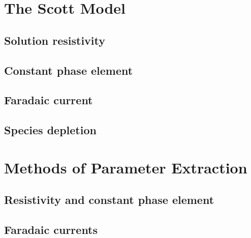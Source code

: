 
\section{The Scott Model}
  \subsection{Solution resistivity}
  \subsection{Constant phase element}
  \subsection{Faradaic current}
  \subsection{Species depletion}
\section{Methods of Parameter Extraction}
  \subsection{Resistivity and constant phase element}
  \subsection{Faradaic currents}


